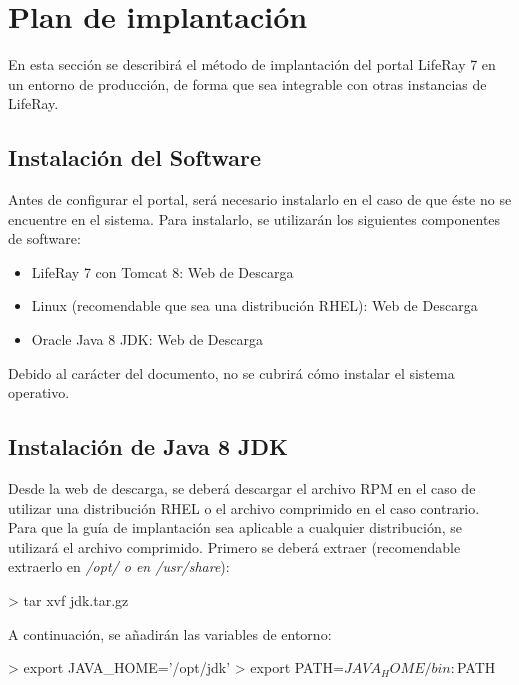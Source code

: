 \section{Plan de implantación}
\par En esta sección se describirá el método de implantación del portal LifeRay 7 en un entorno de producción, de forma que sea integrable con otras instancias de LifeRay.

\subsection{Instalación del Software}
\par Antes de configurar el portal, será necesario instalarlo en el caso de que éste no se encuentre en el sistema. Para instalarlo, se utilizarán los siguientes componentes de software:
\begin{itemize}[-]
    \item LifeRay 7 con Tomcat 8: Web de Descarga
    \item Linux (recomendable que sea una distribución RHEL): Web de Descarga
    \item Oracle Java 8 JDK: Web de Descarga
\end{itemize}
\par Debido al carácter del documento, no se cubrirá cómo instalar el sistema operativo.

\subsection{Instalación de Java 8 JDK}
\par Desde la web de descarga, se deberá descargar el archivo RPM en el caso de utilizar una distribución RHEL o el archivo comprimido en el caso contrario. Para que la guía de implantación sea aplicable a cualquier distribución, se utilizará el archivo comprimido.
Primero se deberá extraer (recomendable extraerlo en \textit{/opt/ o en /usr/share}):

\begin{listing}[style=consola, numbers=none]
> tar xvf jdk.tar.gz
\end{listing}

\par A continuación, se añadirán las variables de entorno:
\begin{listing}[style=consola, numbers=none]
> export JAVA_HOME='/opt/jdk'
> export PATH=$JAVA_HOME/bin:$PATH
\end{listing}

